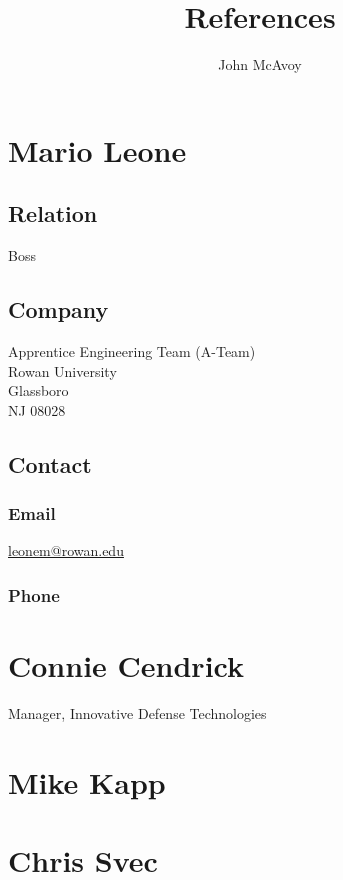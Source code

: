 \documentclass{article}
\title{References}
\author{John McAvoy}
\date{}
\begin{document}
\maketitle

\section{Mario Leone}
\subsection{Relation}
Boss
\subsection{Company}
Apprentice Engineering Team (A-Team) \\ Rowan University \\ Glassboro \\ NJ 08028
\subsection{Contact}
\subsubsection{Email}
\href{mailto:leonem@rowan.edu}{leonem@rowan.edu}
\subsubsection{Phone}

\section{Connie Cendrick}
Manager, Innovative Defense Technologies

\section{Mike Kapp}

\section{Chris Svec}
\end{document}
